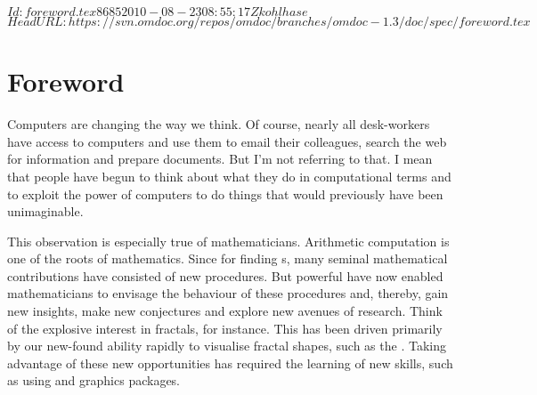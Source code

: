 \svnInfo $Id: foreword.tex 8685 2010-08-23 08:55:17Z kohlhase $
\svnKeyword $HeadURL: https://svn.omdoc.org/repos/omdoc/branches/omdoc-1.3/doc/spec/foreword.tex $

\section*{Foreword}

Computers are changing the way we think. Of course, nearly all desk-workers have access to
computers and use them to email their colleagues, search the web for information and
prepare documents.  But I'm not referring to that. I mean that people have begun to think
about what they do in computational terms and to exploit the power of computers to do
things that would previously have been unimaginable.

This observation is especially true of mathematicians. Arithmetic computation is one of
the roots of mathematics. Since {} for finding
{s}, many seminal mathematical contributions have
consisted of new procedures. But powerful {} have now enabled
mathematicians to envisage the behaviour of these procedures and, thereby, gain new
insights, make new conjectures and explore new avenues of research. Think of the explosive
interest in fractals, for instance.  This has been driven primarily by our new-found
ability rapidly to visualise fractal shapes, such as the {}.
Taking advantage of these new opportunities has required the learning of new skills, such
as using {} and graphics packages.

